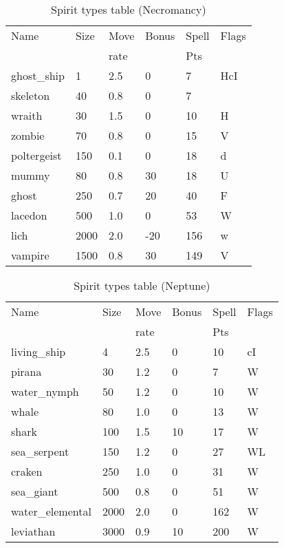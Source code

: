 \begin{same}
\begin{table}[hbpt]
\caption{Spirit types table (Necromancy)}
\begin{tabular}{ || l | l | l | l | l | l || }
\hline
Name            & Size &Move&Bonus&Spell&Flags\\
                &      &rate&     &Pts  &\\
\hline
ghost_ship      &    1 & 2.5&   0 &   7 &HcI\\
skeleton        &   40 & 0.8&   0 &   7 &\\
wraith          &   30 & 1.5&   0 &  10 &H\\
zombie          &   70 & 0.8&   0 &  15 &V\\
poltergeist     &  150 & 0.1&   0 &  18 &d\\
mummy           &   80 & 0.8&  30 &  18 &U\\
ghost           &  250 & 0.7&  20 &  40 &F\\
lacedon         &  500 & 1.0&   0 &  53 &W\\
lich            & 2000 & 2.0& -20 &  156 &w\\
vampire         & 1500 & 0.8&  30 &  149 &V\\
\hline
\end{tabular}
\end{table}
\end{same}
\begin{same}
\begin{table}[hbpt]
\caption{Spirit types table (Neptune)}
\begin{tabular}{ || l | l | l | l | l | l || }
\hline
Name            & Size &Move&Bonus&Spell&Flags\\
                &      &rate&     &Pts  &\\
\hline
living_ship     &    4 & 2.5&   0 &  10 &cI\\
pirana          &   30 & 1.2&   0 &   7 &W\\
water_nymph     &   50 & 1.2&   0 &  10 &W\\
whale           &   80 & 1.0&   0 &  13 &W\\
shark           &  100 & 1.5&  10 &  17 &W\\
sea_serpent     &  150 & 1.2&   0 &  27 &WL\\
craken          &  250 & 1.0&   0 &  31 &W\\
sea_giant       &  500 & 0.8&   0 &  51 &W\\
water_elemental & 2000 & 2.0&   0 &  162 &W\\
leviathan       & 3000 & 0.9&  10 &  200 &W\\
\hline
\end{tabular}
\end{table}
\end{same}
